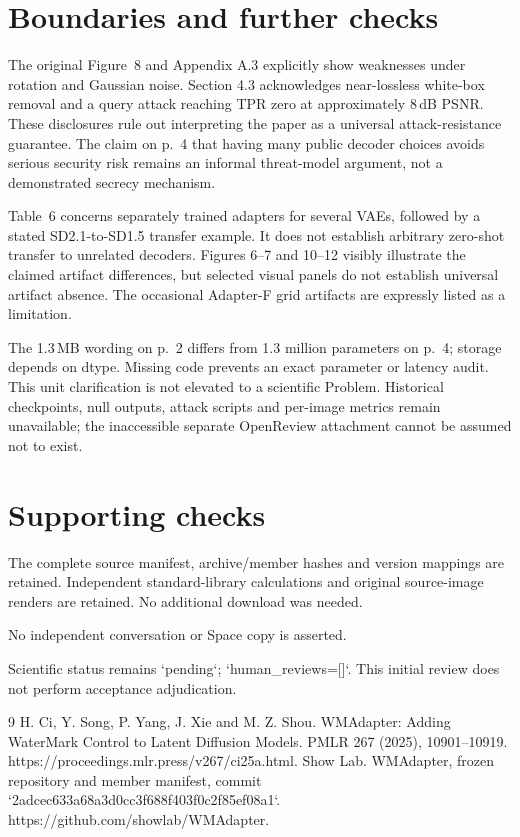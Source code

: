\documentclass[10pt]{article}
\begin{document}
\section*{Boundaries and further checks}
The original Figure 8 and Appendix A.3 explicitly show weaknesses under rotation and Gaussian noise. Section 4.3 acknowledges near-lossless white-box removal and a query attack reaching TPR zero at approximately 8 dB PSNR. These disclosures rule out interpreting the paper as a universal attack-resistance guarantee. The claim on p. 4 that having many public decoder choices avoids serious security risk remains an informal threat-model argument, not a demonstrated secrecy mechanism.\par
Table 6 concerns separately trained adapters for several VAEs, followed by a stated SD2.1-to-SD1.5 transfer example. It does not establish arbitrary zero-shot transfer to unrelated decoders. Figures 6–7 and 10–12 visibly illustrate the claimed artifact differences, but selected visual panels do not establish universal artifact absence. The occasional Adapter-F grid artifacts are expressly listed as a limitation.\par
The 1.3 MB wording on p. 2 differs from 1.3 million parameters on p. 4; storage depends on dtype. Missing code prevents an exact parameter or latency audit. This unit clarification is not elevated to a scientific Problem. Historical checkpoints, null outputs, attack scripts and per-image metrics remain unavailable; the inaccessible separate OpenReview attachment cannot be assumed not to exist.\par
\section*{Supporting checks}
The complete source manifest, archive/member hashes and version mappings are retained. Independent standard-library calculations and original source-image renders are retained. No additional download was needed.\par
No independent conversation or Space copy is asserted.\par
Scientific status remains `pending`; `human\_reviews=[]`. This initial review does not perform acceptance adjudication.\par
9 H. Ci, Y. Song, P. Yang, J. Xie and M. Z. Shou. WMAdapter: Adding WaterMark Control to Latent Diffusion Models. PMLR 267 (2025), 10901–10919. https://proceedings.mlr.press/v267/ci25a.html. Show Lab. WMAdapter, frozen repository and member manifest, commit `2adcec633a68a3d0cc3f688f403f0c2f85ef08a1`. https://github.com/showlab/WMAdapter.\par
\end{document}
